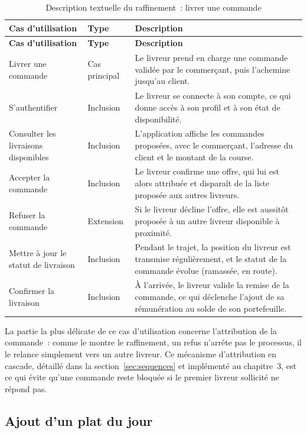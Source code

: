 \documentclass[12pt,fleqn,a4paper]{report}
\begin{document}
\begin{justify}
\begin{longtable}{|l|l|p{8cm}|}
\hline
\textbf{Cas d'utilisation} & \textbf{Type} & \textbf{Description} \\
\hline
\endfirsthead
\hline
\textbf{Cas d'utilisation} & \textbf{Type} & \textbf{Description} \\
\hline
\endhead
\hline
\endfoot
\hline
\caption{Description textuelle du raffinement~: livrer une commande}
\label{tab:raffinement_livrer}
\endlastfoot

Livrer une commande & Cas principal &
Le livreur prend en charge une commande validée par le commerçant, puis l'achemine jusqu'au client. \\
\hline
S'authentifier & Inclusion &
Le livreur se connecte à son compte, ce qui donne accès à son profil et à son état de disponibilité. \\
\hline
Consulter les livraisons disponibles & Inclusion &
L'application affiche les commandes proposées, avec le commerçant, l'adresse du client et le montant de la course. \\
\hline
Accepter la commande & Inclusion &
Le livreur confirme une offre, qui lui est alors attribuée et disparaît de la liste proposée aux autres livreurs. \\
\hline
Refuser la commande & Extension &
Si le livreur décline l'offre, elle est aussitôt proposée à un autre livreur disponible à proximité. \\
\hline
Mettre à jour le statut de livraison & Inclusion &
Pendant le trajet, la position du livreur est transmise régulièrement, et le statut de la commande évolue (ramassée, en route). \\
\hline
Confirmer la livraison & Inclusion &
À l'arrivée, le livreur valide la remise de la commande, ce qui déclenche l'ajout de sa rémunération au solde de son portefeuille. \\
\hline
\end{longtable}

La partie la plus délicate de ce cas d'utilisation concerne l'attribution de la commande~: comme le montre le raffinement, un refus n'arrête pas le processus, il le relance simplement vers un autre livreur. Ce mécanisme d'attribution en cascade, détaillé dans la section~\ref{sec:sequences} et implémenté au chapitre~3, est ce qui évite qu'une commande reste bloquée si le premier livreur sollicité ne répond pas.

\subsection{Ajout d'un plat du jour}


\end{justify}
\end{document}
